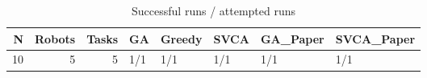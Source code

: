 \begin{table}[htbp]
\centering
\small
\caption{Successful runs / attempted runs}
\label{tab:research_smoke_c1_r1_20261122_outcomes}
\begin{tabular}{rrrlllll}
\hline
N & Robots & Tasks & GA & Greedy & SVCA & GA\_Paper & SVCA\_Paper \\
\hline
10 & 5 & 5 & 1/1 & 1/1 & 1/1 & 1/1 & 1/1 \\
\hline
\end{tabular}
\end{table}
